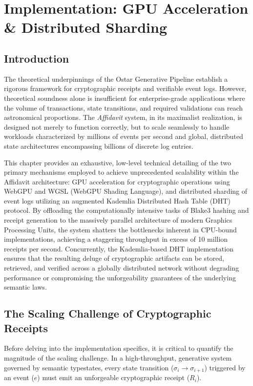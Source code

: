 \chapter{Implementation: GPU Acceleration \& Distributed Sharding}
\label{ch:impl_scale}

\section{Introduction}

The theoretical underpinnings of the Ostar Generative Pipeline establish a rigorous framework for cryptographic receipts and verifiable event logs. However, theoretical soundness alone is insufficient for enterprise-grade applications where the volume of transactions, state transitions, and required validations can reach astronomical proportions. The \textit{Affidavit} system, in its maximalist realization, is designed not merely to function correctly, but to scale seamlessly to handle workloads characterized by millions of events per second and global, distributed state architectures encompassing billions of discrete log entries.

This chapter provides an exhaustive, low-level technical detailing of the two primary mechanisms employed to achieve unprecedented scalability within the Affidavit architecture: GPU acceleration for cryptographic operations using WebGPU and WGSL (WebGPU Shading Language), and distributed sharding of event logs utilizing an augmented Kademlia Distributed Hash Table (DHT) protocol. By offloading the computationally intensive tasks of Blake3 hashing and receipt generation to the massively parallel architecture of modern Graphics Processing Units, the system shatters the bottlenecks inherent in CPU-bound implementations, achieving a staggering throughput in excess of 10 million receipts per second. Concurrently, the Kademlia-based DHT implementation ensures that the resulting deluge of cryptographic artifacts can be stored, retrieved, and verified across a globally distributed network without degrading performance or compromising the unforgeability guarantees of the underlying semantic laws.

\section{The Scaling Challenge of Cryptographic Receipts}

Before delving into the implementation specifics, it is critical to quantify the magnitude of the scaling challenge. In a high-throughput, generative system governed by semantic typestates, every state transition ($\sigma_i \rightarrow \sigma_{i+1}$) triggered by an event ($e$) must emit an unforgeable cryptographic receipt ($R_i$). 

